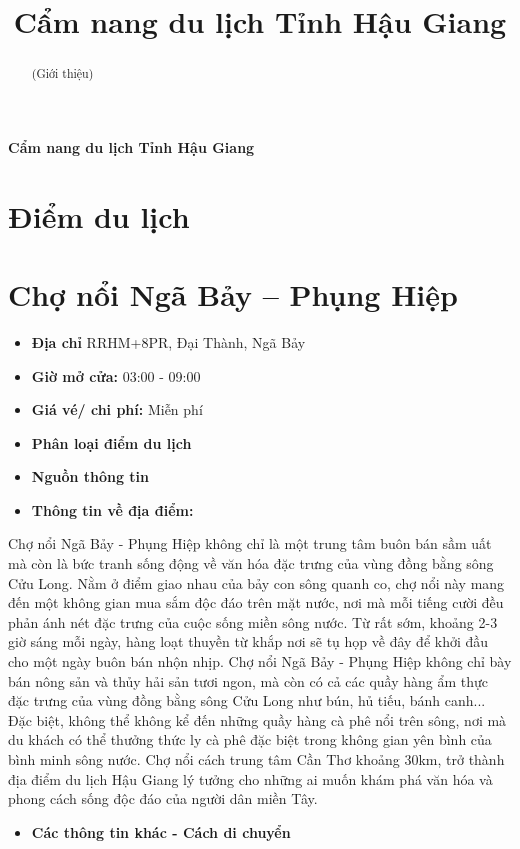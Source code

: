 \documentclass{article}
\title{Cẩm nang du lịch Tỉnh Hậu Giang}
\begin{document}
\begin{center}
    \fontsize{18}{20}\textbf{Cẩm nang du lịch Tỉnh Hậu Giang}
\end{center}
\begin{abstract}
    (Giới thiệu)
\end{abstract}
\section*{Điểm du lịch}

\section{Chợ nổi Ngã Bảy – Phụng Hiệp}
\begin{itemize}
    \item{\textbf{Địa chỉ}} RRHM+8PR, Đại Thành, Ngã Bảy
    \item{\textbf{Giờ mở cửa:}} 03:00 - 09:00
    \item{\textbf{Giá vé/ chi phí:}} Miễn phí
    \item{\textbf{Phân loại điểm du lịch} }
    \item{\textbf{Nguồn thông tin}}
    \item{\textbf{Thông tin về địa điểm:}}
\end{itemize}
Chợ nổi Ngã Bảy - Phụng Hiệp không chỉ là một trung tâm buôn bán sầm uất mà còn là bức tranh sống động về văn hóa đặc trưng của vùng đồng bằng sông Cửu Long. Nằm ở điểm giao nhau của bảy con sông quanh co, chợ nổi này mang đến một không gian mua sắm độc đáo trên mặt nước, nơi mà mỗi tiếng cười đều phản ánh nét đặc trưng của cuộc sống miền sông nước. Từ rất sớm, khoảng 2-3 giờ sáng mỗi ngày, hàng loạt thuyền từ khắp nơi sẽ tụ họp về đây để khởi đầu cho một ngày buôn bán nhộn nhịp.
Chợ nổi Ngã Bảy - Phụng Hiệp không chỉ bày bán nông sản và thủy hải sản tươi ngon, mà còn có cả các quầy hàng ẩm thực đặc trưng của vùng đồng bằng sông Cửu Long như bún, hủ tiếu, bánh canh... Đặc biệt, không thể không kể đến những quầy hàng cà phê nổi trên sông, nơi mà du khách có thể thưởng thức ly cà phê đặc biệt trong không gian yên bình của bình minh sông nước. Chợ nổi cách trung tâm Cần Thơ khoảng 30km, trở thành địa điểm du lịch Hậu Giang lý tưởng cho những ai muốn khám phá văn hóa và phong cách sống độc đáo của người dân miền Tây.

\begin{itemize}
    \item{\textbf{Các thông tin khác - Cách di chuyển}}
\end{itemize}
\end{document}
